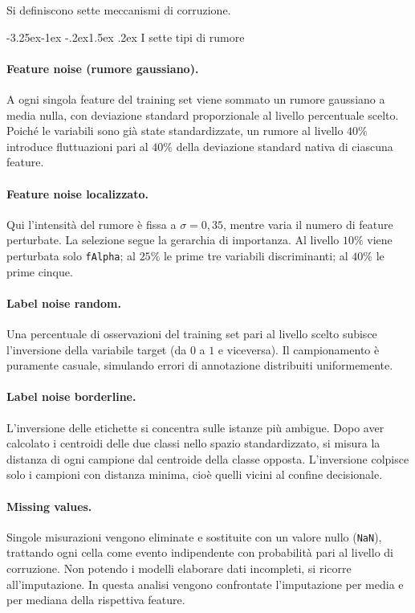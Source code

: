 \documentclass[12pt,a4paper]{article}
\makeatletter
\renewcommand\subsection{\@startsection{subsection}{2}{\z@}%
  {-3.25ex\@plus -1ex \@minus -.2ex}{1.5ex \@plus .2ex}%
  {\normalfont\large\bfseries}}
\makeatother
\begin{document}
Si definiscono sette meccanismi di corruzione.

\subsection{I sette tipi di rumore}

\paragraph{Feature noise (rumore gaussiano).} A ogni singola feature del
training set viene sommato un rumore gaussiano a media nulla, con deviazione
standard proporzionale al livello percentuale scelto. Poiché le variabili sono
già state standardizzate, un rumore al livello $40\%$ introduce fluttuazioni
pari al $40\%$ della deviazione standard nativa di ciascuna feature.

\paragraph{Feature noise localizzato.} Qui l'intensità del rumore è fissa a
$\sigma = 0{,}35$, mentre varia il numero di feature perturbate. La selezione
segue la gerarchia di importanza. Al livello $10\%$ viene perturbata solo
\texttt{fAlpha}; al $25\%$ le prime tre variabili discriminanti; al $40\%$ le
prime cinque.

\paragraph{Label noise random.} Una percentuale di osservazioni del training set
pari al livello scelto subisce l'inversione della variabile target (da $0$ a $1$
e viceversa). Il campionamento è puramente casuale, simulando errori di
annotazione distribuiti uniformemente.

\paragraph{Label noise borderline.} L'inversione delle etichette si concentra
sulle istanze più ambigue. Dopo aver calcolato i centroidi delle due classi
nello spazio standardizzato, si misura la distanza di ogni campione dal
centroide della classe opposta. L'inversione colpisce solo i campioni con
distanza minima, cioè quelli vicini al confine decisionale.

\paragraph{Missing values.} Singole misurazioni vengono eliminate e sostituite
con un valore nullo (\texttt{NaN}), trattando ogni cella come evento
indipendente con probabilità pari al livello di corruzione. Non potendo i
modelli elaborare dati incompleti, si ricorre all'imputazione. In questa analisi
vengono confrontate l'imputazione per media e per mediana della rispettiva
feature.
\end{document}
